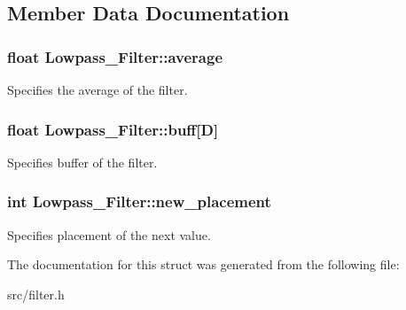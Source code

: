 \subsection{Member Data Documentation}
\hypertarget{struct_lowpass___filter_af4a4ffb094091c8aab28cfb9d6f4d295}{
\subsubsection[{average}]{\setlength{\rightskip}{0pt plus 5cm}float Lowpass\-\_\-\-Filter\-::average}}\label{struct_lowpass___filter_af4a4ffb094091c8aab28cfb9d6f4d295}
Specifies the average of the filter. \hypertarget{struct_lowpass___filter_a07a03e4c0421fe68ec73d04f81bb4958}{
\subsubsection[{buff}]{\setlength{\rightskip}{0pt plus 5cm}float Lowpass\-\_\-\-Filter\-::buff\mbox{[}D\mbox{]}}}\label{struct_lowpass___filter_a07a03e4c0421fe68ec73d04f81bb4958}
Specifies buffer of the filter. \hypertarget{struct_lowpass___filter_a9095f7e48ca87295fb2017b273033913}{
\subsubsection[{new\-\_\-placement}]{\setlength{\rightskip}{0pt plus 5cm}int Lowpass\-\_\-\-Filter\-::new\-\_\-placement}}\label{struct_lowpass___filter_a9095f7e48ca87295fb2017b273033913}
Specifies placement of the next value. 

The documentation for this struct was generated from the following file\-:\begin{DoxyCompactItemize}
\item 
src/filter.\-h\end{DoxyCompactItemize}
